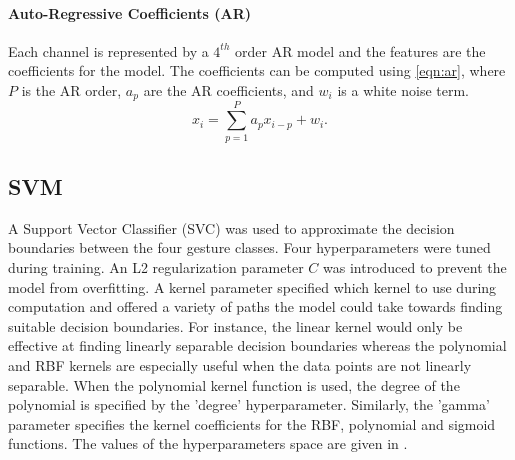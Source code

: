 \documentclass[journal]{IEEEtran}
\begin{document}
\paragraph{Auto-Regressive Coefficients (AR)}
Each channel is represented by a $4^{th}$ order AR model and the features are the coefficients for the model. The coefficients can be computed using \cref{eqn:ar}, where $P$ is the AR order, $a_p$ are the AR coefficients, and $w_i$ is a white noise term.
\begin{equation}
 x_i = \sum_{p=1}^{P}a_px_{i-p}+w_i.
\label{eqn:ar}
\end{equation}

\subsection{SVM}
A Support Vector Classifier (SVC) was used to approximate the decision boundaries between the four gesture classes. Four hyperparameters were tuned during training. An L2 regularization parameter $C$ was introduced to prevent the model from overfitting. A kernel parameter specified which kernel to use during computation and offered a variety of paths the model could take towards finding suitable decision boundaries. For instance, the linear kernel would only be effective at finding linearly separable decision boundaries whereas the polynomial and RBF kernels are especially useful when the data points are not linearly separable. When the polynomial kernel function is used, the degree of the polynomial is specified by the 'degree' hyperparameter. Similarly, the 'gamma' parameter specifies the kernel coefficients for the RBF, polynomial and sigmoid functions. The values of the hyperparameters space are given in .

\begingroup
\def\arraystretch{1.2}%
\setlength{\tabcolsep}{2pt} %
\begin{table}[b]
	\centering
	\caption{SVM Hyperparameter Tuning Space.}
	\label{table:svm_param}
\end{table}%
\endgroup
\end{document}
